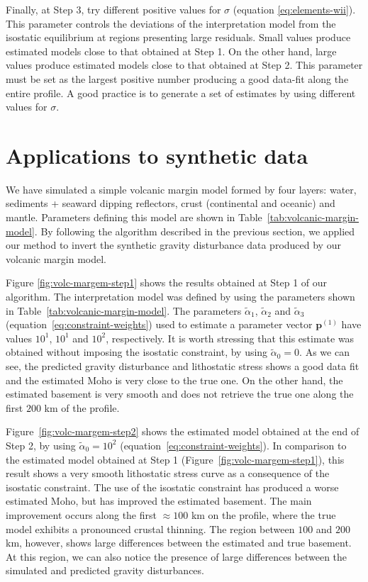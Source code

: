 \documentclass[manuscript]{geophysics}
\begin{document}
Finally, at Step 3, try different positive values for $\sigma$ (equation \ref{eq:elements-wii}).
This parameter controls the deviations of the interpretation model from the
isostatic equilibrium at regions presenting large residuals.
Small values produce estimated models close to that obtained at Step 1.
On the other hand, large values produce estimated models close to that
obtained at Step 2.
This parameter must be set as the largest positive number producing a good data-fit
along the entire profile. A good practice is to generate a set of estimates by using 
different values for $\sigma$. 


\section{Applications to synthetic data}


We have simulated a simple volcanic margin model formed by four layers: 
water, sediments + seaward dipping reflectors, crust (continental and oceanic) 
and mantle. 
Parameters defining this model are shown in Table~\ref{tab:volcanic-margin-model}.
By following the algorithm described in the previous section, we applied our method 
to invert the synthetic gravity disturbance data produced by our volcanic margin model.

Figure \ref{fig:volc-margem-step1} shows the results obtained at Step 1 of our
algorithm.
The interpretation model was defined by using the parameters shown in
Table~\ref{tab:volcanic-margin-model}.
The parameters $\tilde{\alpha}_{1}$, $\tilde{\alpha}_{2}$ and 
$\tilde{\alpha}_{3}$ (equation~\ref{eq:constraint-weights}) used to estimate a parameter 
vector $\mathbf{p}^{(1)}$ have values $10^{1}$, $10^{1}$ and $10^{2}$, respectively.
It is worth stressing that this estimate was obtained without imposing the 
isostatic constraint, by using $\tilde{\alpha}_{0} = 0$.
As we can see, the predicted gravity disturbance and lithostatic stress 
shows a good data fit and the estimated Moho is very close to the true one.
On the other hand, the estimated basement is very smooth and does not
retrieve the true one along the first $200$ km of the profile.

Figure~\ref{fig:volc-margem-step2} shows the estimated model obtained at the end
of Step 2, by using $\tilde{\alpha}_{0} = 10^{2}$ (equation~\ref{eq:constraint-weights}).
In comparison to the estimated model obtained at Step 1 (Figure~\ref{fig:volc-margem-step1}),
this result shows a very smooth lithostatic stress curve as a consequence of the
isostatic constraint. The use of the isostatic constraint has produced a worse estimated Moho, 
but has improved the estimated basement. The main improvement occurs along the 
first $\approx 100$ km on the profile, where the true model exhibits a pronounced crustal
thinning. The region between $100$ and $200$ km, however, shows large 
differences between the estimated and true basement. At this region, we can also
notice the presence of large differences between the simulated and predicted gravity
disturbances.
\end{document}
